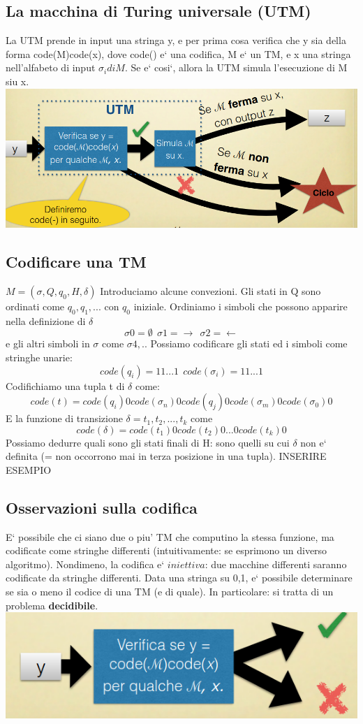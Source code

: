 \documentclass[a4paper, 12pt]{article}
\begin{document}
\subsection{La macchina di Turing universale (UTM)}
La UTM prende in input una stringa y, e per prima cosa verifica che y sia della forma code(M)code(x), dove code() e` una codifica, M e` un TM, e x una stringa nell'alfabeto di input \(\sigma_i di M.\)
Se e` cosi`, allora la UTM simula l'esecuzione di M siu x.\\ \includegraphics[scale=0.5]{UTM.png}
\subsection{Codificare una TM}
\(M = (\sigma, Q, q_0, H, \delta)\)
Introduciamo alcune convezioni. Gli stati in Q sono ordinati come \(q_0,q_1,...\) con \(q_0\) iniziale. Ordiniamo i simboli che possono apparire nella definizione di \(\delta\)
\[\sigma0 = \emptyset \   \ \sigma1 = \rightarrow \    \ \sigma2=\leftarrow \]
e gli altri simboli in \(\sigma\) come \(\sigma4,..\)
Possiamo codificare gli stati ed i simboli come stringhe unarie: \[code(q_i) = 11...1 \   \ code(\sigma_i)=11...1\]
Codifichiamo una tupla t di $\delta$ come: \[code(t) =code(q_i)0code(\sigma_n)0code(q_j)0code(\sigma_m)0code(\sigma_0)0\]
E la funzione di transizione $\delta={t_1,t_2,...,t_k}$ come \[code(\delta) = code(t_1)0code(t_2)0...0code(t_k)0\]
Possiamo dedurre quali sono gli stati finali di H: sono quelli su cui $\delta$ non e` definita (= non occorrono mai in terza posizione in una tupla).
INSERIRE ESEMPIO
\subsection{Osservazioni sulla codifica}
E` possibile che ci siano due o piu' TM che computino la stessa funzione, ma codificate come stringhe differenti (intuitivamente: se esprimono un diverso algoritmo). Nondimeno, la codifica e` \(iniettiva\): due macchine differenti saranno codificate da stringhe differenti. Data una stringa su {0,1}, e` possibile determinare se sia o meno il codice di una TM (e di quale). In particolare: si tratta di un problema \textbf{decidibile}.\\
\includegraphics[scale=0.6]{codifica_UTM.png}
\end{document}

